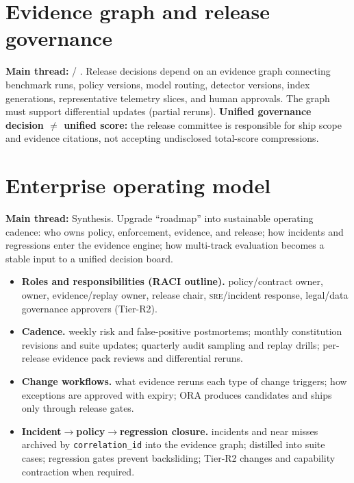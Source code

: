 \documentclass[11pt,a4paper]{report}
\begin{document}
\section{Evidence graph and release governance}
\textbf{Main thread:} \EvalFramework{} / \ControlPlane{}. Release decisions depend on an evidence graph connecting benchmark runs, policy versions, model routing, detector versions, index generations, representative telemetry slices, and human approvals. The graph must support differential updates (partial reruns). \textbf{Unified governance decision \(\neq\) unified score:} the release committee is responsible for ship scope and evidence citations, not accepting undisclosed total-score compressions.

\section{Enterprise operating model}
\textbf{Main thread:} Synthesis. Upgrade “roadmap” into sustainable operating cadence: who owns policy, enforcement, evidence, and release; how incidents and regressions enter the evidence engine; how multi-track evaluation becomes a stable input to a unified decision board.
\begin{itemize}
  \item \textbf{Roles and responsibilities (RACI outline).} policy/contract owner, \SafetyKernel{} owner, evidence/replay owner, release chair, \textsc{sre}/incident response, legal/data governance approvers (Tier-R2).
  \item \textbf{Cadence.} weekly risk and false-positive postmortems; monthly constitution revisions and suite updates; quarterly audit sampling and replay drills; per-release evidence pack reviews and differential reruns.
  \item \textbf{Change workflows.} what evidence reruns each type of change triggers; how exceptions are approved with expiry; ORA produces candidates and ships only through release gates.
  \item \textbf{Incident$\rightarrow$policy$\rightarrow$regression closure.} incidents and near misses archived by \texttt{correlation\_id} into the evidence graph; distilled into suite cases; regression gates prevent backsliding; Tier-R2 changes and capability contraction when required.
\end{itemize}
\end{document}
